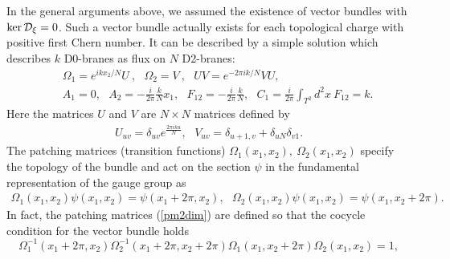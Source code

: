 \documentclass[a4paper,epsf,12pt]{article}
\newcommand{\cD}{{\cal D}}
\newcommand{\fr}{\frac}
\def \cD{{\cal D}}
\begin{document}
\vspace{2mm}

In the general arguments above, we assumed the existence of vector bundles 
with $\ker\cD_\xi=0$. Such a vector bundle actually exists for each 
topological charge with positive first Chern number. 
It can be described by a simple solution which describes $k$ D0-branes 
as flux on $N$ D2-branes:
\begin{eqnarray}
&&\Omega_{1}=e^{ikx_2/N}U\ ,~~~ \Omega_{2}=V\ ,~~~ 
 UV=e^{-2\pi ik/N}VU,\label{pm2dim}\\
&&A_1=0,~~~A_2=-\frac{i}{2\pi}\frac{k}{N}x_1,
~~~F_{12}=-\fr{i}{2\pi}\fr{k}{N},~~~C_1=\fr{i}{2\pi}\int_{T^2}d^2x~F_{12}=k.
\label{gf2dim}
\end{eqnarray}
Here the matrices $U$ and $V$ are $N\times N$ matrices
defined by
\begin{eqnarray}
\label{uv}
U_{uv}=\delta_{uv} e^{\frac{2\pi i k u}{N}},~~~V_{uv}
=\delta_{u+1,v}
+\delta_{uN}\delta_{v1}. 
\end{eqnarray}
The patching matrices (transition functions)
$\Omega_{1}(x_1,x_2),~\Omega_{2}(x_1,x_2)$ 
specify the topology of the bundle
and act on the section $\psi$ 
in the fundamental representation of the gauge group as 
\begin{eqnarray}
\label{compa}
\Omega_{1}(x_1,x_2)\psi(x_1,x_2)=\psi(x_1+2\pi,x_2),~~~
\Omega_{2}(x_1,x_2)\psi(x_1,x_2)=\psi(x_1,x_2+2\pi).
\end{eqnarray}
In fact, the patching matrices (\ref{pm2dim}) are defined 
so that the cocycle condition for the vector bundle holds 
\begin{equation*}
\Omega_{1}^{-1}(x_1+2\pi,x_2)\Omega^{-1}_{2}(x_1+2\pi,x_2+2\pi)
\Omega_{1}(x_1,x_2+2\pi)\Omega_{2}(x_1,x_2)=1, 
\end{equation*}
\end{document}
